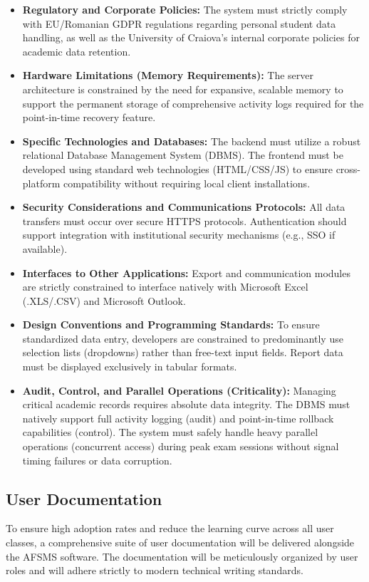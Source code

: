 \documentclass[11pt, a4paper]{article}
\begin{document}
\begin{itemize}
    \item \textbf{Regulatory and Corporate Policies:} The system must strictly comply with EU/Romanian GDPR regulations regarding personal student data handling, as well as the University of Craiova's internal corporate policies for academic data retention.
    \item \textbf{Hardware Limitations (Memory Requirements):} The server architecture is constrained by the need for expansive, scalable memory to support the permanent storage of comprehensive activity logs required for the point-in-time recovery feature.
    \item \textbf{Specific Technologies and Databases:} The backend must utilize a robust relational Database Management System (DBMS). The frontend must be developed using standard web technologies (HTML/CSS/JS) to ensure cross-platform compatibility without requiring local client installations.
    \item \textbf{Security Considerations and Communications Protocols:} All data transfers must occur over secure HTTPS protocols. Authentication should support integration with institutional security mechanisms (e.g., SSO if available).
    \item \textbf{Interfaces to Other Applications:} Export and communication modules are strictly constrained to interface natively with Microsoft Excel (.XLS/.CSV) and Microsoft Outlook.
    \item \textbf{Design Conventions and Programming Standards:} To ensure standardized data entry, developers are constrained to predominantly use selection lists (dropdowns) rather than free-text input fields. Report data must be displayed exclusively in tabular formats.
    \item \textbf{Audit, Control, and Parallel Operations (Criticality):} Managing critical academic records requires absolute data integrity. The DBMS must natively support full activity logging (audit) and point-in-time rollback capabilities (control). The system must safely handle heavy parallel operations (concurrent access) during peak exam sessions without signal timing failures or data corruption.
\end{itemize}

\subsection{User Documentation}
To ensure high adoption rates and reduce the learning curve across all user classes, a comprehensive suite of user documentation will be delivered alongside the AFSMS software. The documentation will be meticulously organized by user roles and will adhere strictly to modern technical writing standards.
\end{document}
